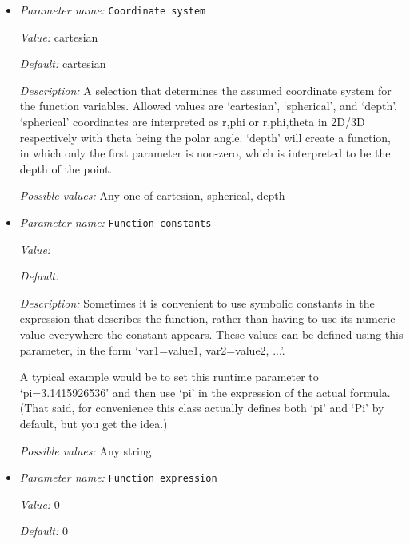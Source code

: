 \begin{itemize}
\item {\it Parameter name:} {\tt Coordinate system}
\label{parameters:Boundary temperature model/Function/Coordinate system}


{\it Value:} cartesian


{\it Default:} cartesian


{\it Description:} A selection that determines the assumed coordinate system for the function variables. Allowed values are `cartesian', `spherical', and `depth'. `spherical' coordinates are interpreted as r,phi or r,phi,theta in 2D/3D respectively with theta being the polar angle. `depth' will create a function, in which only the first parameter is non-zero, which is interpreted to be the depth of the point.


{\it Possible values:} Any one of cartesian, spherical, depth
\item {\it Parameter name:} {\tt Function constants}
\label{parameters:Boundary temperature model/Function/Function constants}


{\it Value:} 


{\it Default:} 


{\it Description:} Sometimes it is convenient to use symbolic constants in the expression that describes the function, rather than having to use its numeric value everywhere the constant appears. These values can be defined using this parameter, in the form `var1=value1, var2=value2, ...'.

A typical example would be to set this runtime parameter to `pi=3.1415926536' and then use `pi' in the expression of the actual formula. (That said, for convenience this class actually defines both `pi' and `Pi' by default, but you get the idea.)


{\it Possible values:} Any string
\item {\it Parameter name:} {\tt Function expression}
\label{parameters:Boundary temperature model/Function/Function expression}


{\it Value:} 0


{\it Default:} 0



\end{itemize}
